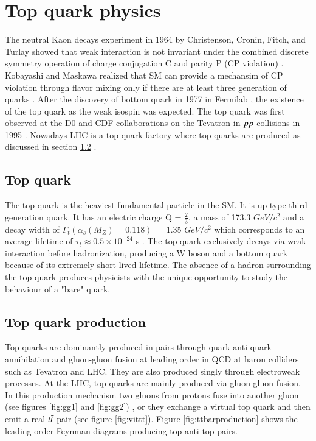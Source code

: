 
\section{Top quark physics}
The neutral Kaon decays experiment in 1964 by Christenson, Cronin, Fitch, and Turlay showed that weak interaction is not invariant under the combined discrete symmetry operation of charge conjugation C and parity P (CP violation) \cite{PhysRevLett.13.138}. Kobayashi and Maskawa realized that SM can provide a mechansim of CP violation through flavor mixing only if there are at least three generation of quarks \cite{kobayashi1973cp}. After the discovery of bottom quark in 1977 in Fermilab \cite{PhysRevLett.39.252}, the existence of the top quark as the weak isospin was expected. The top quark was first observed at the D0 and CDF collaborations on the Tevatron in $p\Bar{p}$ collisions in 1995 \cite{PhysRevLett.74.2626,PhysRevLett.74.2632}. Nowadays LHC is a top quark factory where top quarks are produced as discussed in section \ref{subsec:topquarkproduction}  .

\subsection{Top quark}
\label{subsec:topquark}
The top quark is the heaviest fundamental particle in the SM. It is up-type third generation quark. It has an electric charge Q = $\frac{2}{3}$, a mass of 173.3 $GeV/c^{2}$ and a decay width of $\Gamma_{t}(\alpha_{s}(M_{Z}) = 0.118)=$ 1.35 $GeV/c^{2}$ which corresponds to an average lifetime of $\tau_{t} \approx 0.5 \times 10^{-24}$ s \cite{ParticleDataGroup:2016lqr}. The top quark exclusively decays via weak interaction before hadronization, producing a W boson and a bottom quark because of its extremely short-lived lifetime. The absence of a hadron surrounding the top quark produces physicists with the unique opportunity to study the behaviour of a "bare" quark.

\subsection{Top quark production}
\label{subsec:topquarkproduction}

Top quarks are  dominantly produced in pairs through quark anti-quark annihilation and gluon-gluon fusion at leading order in QCD at haron colliders such as Tevatron and LHC. They are also produced singly through electroweak processes. At the LHC, top-quarks are mainly produced via gluon-gluon fusion. In this production mechanism two gluons from protons fuse into another gluon (see figures \ref{fig:gg1} and \ref{fig:gg2}) , or they exchange a virtual top quark and then emit a real $t\Bar{t}$ pair (see figure \ref{fig:vittt}). Figure \ref{fig:ttbarproduction} shows the leading order Feynman diagrams producing top anti-top pairs. 

